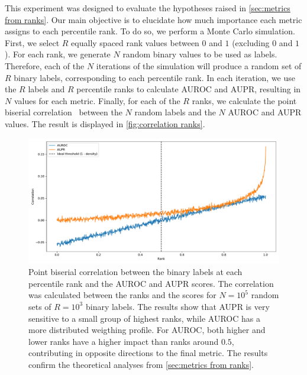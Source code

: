 This experiment was designed to evaluate the hypotheses raised in \autoref{sec:metrics from ranks}. Our main objective is to elucidate how much importance each metric assigns to each percentile rank. To do so, we perform a Monte Carlo simulation. First, we select $R$ equally spaced rank values between $0$ and $1$ (excluding $0$ and $1$). For each rank, we generate $N$ random binary values to be used as labels. Therefore, each of the $N$ iterations of the simulation will produce a random set of $R$ binary labels, corresponding to each percentile rank. In each iteration, we use the $R$ labels and $R$ percentile ranks to calculate AUROC and AUPR, resulting in $N$ values for each metric. Finally, for each of the $R$ ranks, we calculate the point biserial correlation~\cite{kornbrot2014point} between the $N$ random labels and the $N$ AUROC and AUPR values. The result is displayed in \autoref{fig:correlation ranks}.


\begin{figure}[bth]
    \includegraphics[width=\textwidth]{
        experiments/theoretical_scoring/results/rank_correlation.pdf
    }
    \caption{
        Point biserial correlation between the binary labels at each percentile rank and the AUROC and AUPR scores. The correlation was calculated between the ranks and the scores for $N=10^5$ random sets of $R=10^3$ binary labels. The results show that AUPR is very sensitive to a small group of highest ranks, while AUROC has a more distributed weigthing profile. For AUROC, both higher and lower ranks have a higher impact than ranks around $0.5$, contributing in opposite directions to the final metric. The results confirm the theoretical analyses from \autoref{sec:metrics from ranks}.
    }
    \label{fig:correlation ranks}
\end{figure}

